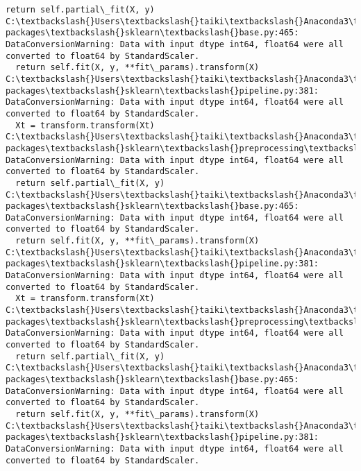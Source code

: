 \documentclass[a4j, dvipdfmx]{jsarticle}
\begin{document}
\begin{Verbatim}[commandchars=\\\{\}]
  return self.partial\_fit(X, y)
C:\textbackslash{}Users\textbackslash{}taiki\textbackslash{}Anaconda3\textbackslash{}Lib\textbackslash{}site-packages\textbackslash{}sklearn\textbackslash{}base.py:465: DataConversionWarning: Data with input dtype int64, float64 were all converted to float64 by StandardScaler.
  return self.fit(X, y, **fit\_params).transform(X)
C:\textbackslash{}Users\textbackslash{}taiki\textbackslash{}Anaconda3\textbackslash{}Lib\textbackslash{}site-packages\textbackslash{}sklearn\textbackslash{}pipeline.py:381: DataConversionWarning: Data with input dtype int64, float64 were all converted to float64 by StandardScaler.
  Xt = transform.transform(Xt)
C:\textbackslash{}Users\textbackslash{}taiki\textbackslash{}Anaconda3\textbackslash{}Lib\textbackslash{}site-packages\textbackslash{}sklearn\textbackslash{}preprocessing\textbackslash{}data.py:625: DataConversionWarning: Data with input dtype int64, float64 were all converted to float64 by StandardScaler.
  return self.partial\_fit(X, y)
C:\textbackslash{}Users\textbackslash{}taiki\textbackslash{}Anaconda3\textbackslash{}Lib\textbackslash{}site-packages\textbackslash{}sklearn\textbackslash{}base.py:465: DataConversionWarning: Data with input dtype int64, float64 were all converted to float64 by StandardScaler.
  return self.fit(X, y, **fit\_params).transform(X)
C:\textbackslash{}Users\textbackslash{}taiki\textbackslash{}Anaconda3\textbackslash{}Lib\textbackslash{}site-packages\textbackslash{}sklearn\textbackslash{}pipeline.py:381: DataConversionWarning: Data with input dtype int64, float64 were all converted to float64 by StandardScaler.
  Xt = transform.transform(Xt)
C:\textbackslash{}Users\textbackslash{}taiki\textbackslash{}Anaconda3\textbackslash{}Lib\textbackslash{}site-packages\textbackslash{}sklearn\textbackslash{}preprocessing\textbackslash{}data.py:625: DataConversionWarning: Data with input dtype int64, float64 were all converted to float64 by StandardScaler.
  return self.partial\_fit(X, y)
C:\textbackslash{}Users\textbackslash{}taiki\textbackslash{}Anaconda3\textbackslash{}Lib\textbackslash{}site-packages\textbackslash{}sklearn\textbackslash{}base.py:465: DataConversionWarning: Data with input dtype int64, float64 were all converted to float64 by StandardScaler.
  return self.fit(X, y, **fit\_params).transform(X)
C:\textbackslash{}Users\textbackslash{}taiki\textbackslash{}Anaconda3\textbackslash{}Lib\textbackslash{}site-packages\textbackslash{}sklearn\textbackslash{}pipeline.py:381: DataConversionWarning: Data with input dtype int64, float64 were all converted to float64 by StandardScaler.

\end{Verbatim}
\end{document}
